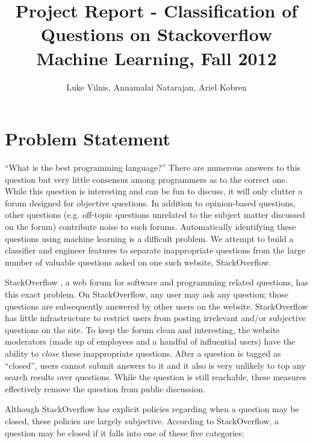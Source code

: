 \documentclass[11pt]{article}
\title{Project Report - Classification of Questions on Stackoverflow\\ Machine Learning, Fall 2012}
\author{Luke Vilnis, Annamalai Natarajan, Ariel Kobren}
\begin{document}
\sloppy

\maketitle

\section{Problem Statement}

``What is the best programming language?'' There are numerous answers
to this question but very little consensus among programmers as to the
correct one. While this question is interesting and can be fun to
discuss, it will only clutter a forum designed for objective questions.
In addition to opinion-based questions, other questions (e.g. off-topic questions unrelated to the
subject matter discussed on the forum) contribute noise to such forums. Automatically identifying these questions using machine learning is a difficult problem. We attempt to build a classifier and engineer features to separate inappropriate questions from the large number of valuable questions asked on one such website, StackOverflow.

 StackOverflow \cite{website:stackoverflow}, a web forum
for software and programming related questions,
has this exact problem. On StackOverflow, any user may ask any
question; those questions are subsequently answered by other users on
the website. StackOverflow has little infrastructure to restrict users
from posting irrelevant and/or subjective questions on the site. To
keep the forum clean and interesting, the website moderators (made up of employees and a
handful of influential users) have the ability to \emph{close} these
inappropriate questions. After a question is tagged as ``closed'', users cannot submit answers to it and it also is very unlikely to top any search results over questions. While the question
is still reachable, these measures effectively remove the question
from public discussion.

 Although StackOverflow has explicit policies regarding when
a question may be closed, these policies are largely
subjective. According to StackOverflow, a question may be closed if it
falls into one of these five categories:
\end{document}
